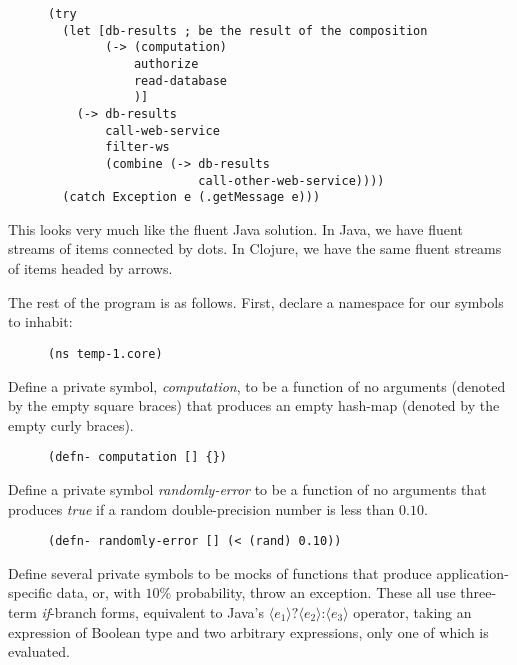 \documentclass[11pt]{article}
\begin{document}
\begin{figure}[H]
\label{functional-main-1}
\begin{verbatim}
(try
  (let [db-results ; be the result of the composition
        (-> (computation)
            authorize
            read-database
            )]
    (-> db-results 
        call-web-service
        filter-ws
        (combine (-> db-results
                     call-other-web-service))))
  (catch Exception e (.getMessage e)))
\end{verbatim}
\end{figure}

This looks very much like the fluent Java solution. In Java, we have
fluent streams of items connected by dots. In Clojure, we have the
same fluent streams of items headed by arrows.

The rest of the program is as follows. First, declare a namespace
for our symbols to inhabit:

\begin{figure}[H]
\label{functional-helpers-1}
\begin{verbatim}
(ns temp-1.core)
\end{verbatim}
\end{figure}

Define a private symbol, \emph{computation}, to be a function of no
arguments (denoted by the empty square braces) that produces an
empty hash-map (denoted by the empty curly braces).

\begin{figure}[H]
\label{functional-helpers-2}
\begin{verbatim}
(defn- computation [] {})
\end{verbatim}
\end{figure}

Define a private symbol \emph{randomly-error} to be a function of no
arguments that produces \emph{true} if a random double-precision number
is less than $0.10$. 

\begin{figure}[H]
\label{functional-helpers-3}
\begin{verbatim}
(defn- randomly-error [] (< (rand) 0.10))
\end{verbatim}
\end{figure}

Define several private symbols to be mocks of functions that produce
application-specific data, or, with $10\%$ probability, throw an
exception. These all use three-term \emph{if}-branch forms, equivalent to Java's
$\langle{}e_1\rangle{}\texttt{?}\langle{}e_2\rangle{}\texttt{:}\langle{}e_3\rangle{}$
operator, taking an expression of Boolean type and two arbitrary
expressions, only one of which is evaluated.
\end{document}
